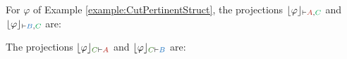 \begin{example}
\label{example:OProjections}
For $\varphi$ of Example \ref{example:CutPertinentStruct}, the projections $\projectionO{\varphi}{\seq \hA{A}, \hE{C}}$ and $\projectionO{\varphi}{\seq \hB{B}, \hE{C}}$ are:
\begin{small}
\begin{multicols}{2}{
\begin{prooftree}
	 
	 
							 
\end{prooftree}

\begin{prooftree}
	 
	 
							 
\end{prooftree}
}
\end{multicols}
\end{small}

\noindent
The projections $\projectionO{\varphi}{\hF{C} \seq \hA{A}}$ and $\projectionO{\varphi}{\hF{C} \seq \hB{B}}$ are:
\begin{small}
\begin{multicols}{2}{
\begin{prooftree}
 
 
								 
								 
\end{prooftree}

\begin{prooftree}
 
 
								 
								 
\end{prooftree}
}
\end{multicols}
\end{small}


\end{example}

